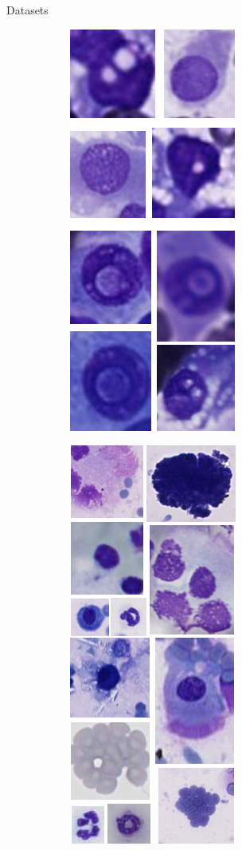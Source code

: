 \documentclass{beamer}
\begin{document}
\begin{frame}{Datasets}
\begin{figure}
    \begin{subfigure}{0.1\textwidth}\includegraphics[scale=0.35]{images/illus_cells.png}\end{subfigure}
    \begin{subfigure}{0.1\textwidth}\includegraphics[scale=0.35]{images/illus_lbtd_lba.png}\end{subfigure}

\end{figure}
\end{frame}
\end{document}
